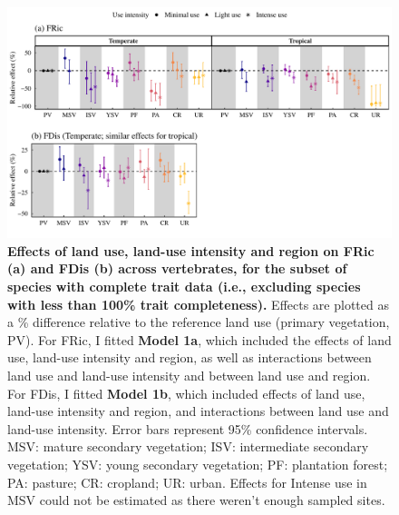 \begin{figure}[h!]
\centering
\includegraphics[scale=0.7]{Supporting/Chapter3/Figures/SI_Figure18}
\caption[Effects of land use, land-use intensity and region on FRic (a) and FDis (b) across vertebrates, for the subset of species with complete trait data]{\textbf{Effects of land use, land-use intensity and region on FRic (a) and FDis (b) across vertebrates, for the subset of species with complete trait data (i.e., excluding species with less than 100\% trait completeness).} Effects are plotted as a \% difference relative to the reference land use (primary vegetation, PV). For FRic, I fitted \textbf{Model 1a}, which included the effects of land use, land-use intensity and region, as well as interactions between land use and land-use intensity and between land use and region. For FDis, I fitted \textbf{Model 1b}, which included effects of land use, land-use intensity and region, and interactions between land use and land-use intensity. Error bars represent 95\% confidence intervals. MSV: mature secondary vegetation; ISV: intermediate secondary vegetation; YSV: young secondary vegetation; PF: plantation forest; PA: pasture; CR: cropland; UR: urban. Effects for Intense use in MSV could not be estimated as there weren’t enough sampled sites.}
\label{SI3_F18}
\end{figure}


